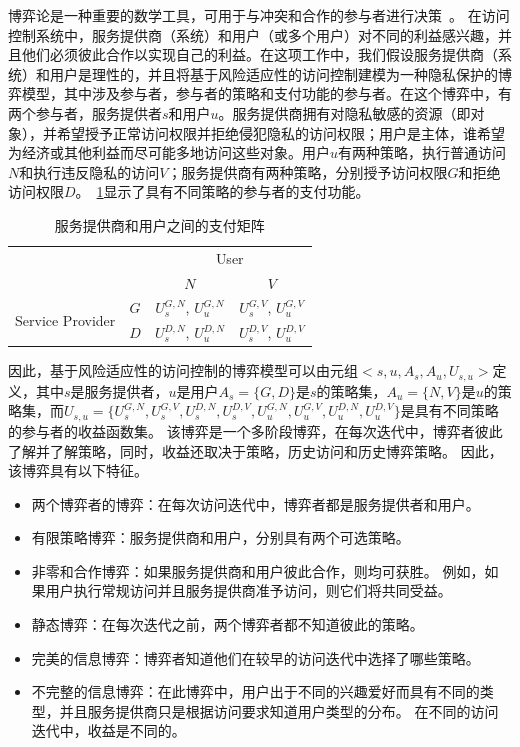 博弈论是一种重要的数学工具，可用于与冲突和合作的参与者进行决策~\cite{owen2001}。
在访问控制系统中，服务提供商（系统）和用户（或多个用户）对不同的利益感兴趣，并且他们必须彼此合作以实现自己的利益。在这项工作中，我们假设服务提供商（系统）和用户是理性的，并且将基于风险适应性的访问控制建模为一种隐私保护的博弈模型，其中涉及参与者，参与者的策略和支付功能的参与者。在这个博弈中，有两个参与者，服务提供者$s$和用户$u$。服务提供商拥有对隐私敏感的资源（即对象），并希望授予正常访问权限并拒绝侵犯隐私的访问权限；用户是主体，谁希望为经济或其他利益而尽可能多地访问这些对象。用户$u$有两种策略，执行普通访问$N$和执行违反隐私的访问$V$；服务提供商有两种策略，分别授予访问权限$G$和拒绝访问权限$D$。~\ref{tab:payoff}显示了具有不同策略的参与者的支付功能。
\begin{table}[htb]
	\caption{服务提供商和用户之间的支付矩阵}\label{tab:payoff}
	\centering 
	\begin{tabular}{cccc}
		\toprule
		\multicolumn{2}{c}{\multirow{2}{*}{}} & \multicolumn{2}{c}{User} \\
		\cline{3-4}
		& & $N$ & $V$ \\	
		\hline
		\multirow{2}{*}{Service Provider} & $G$ &$U_s^{G,N}$, $U_u^{G,N}$ & $U_s^{G,V}$, $U_u^{G,V}$\\
		\cline{2-4}
		& $D$ & $U_s^{D,N}$, $U_u^{D,N}$ & $U_s^{D,V}$, $U_u^{D,V}$\\
		\toprule
	\end{tabular}
\end{table}


因此，基于风险适应性的访问控制的博弈模型可以由元组$<s,u,A_s,A_u,U_{s,u}>$定义，其中$s$是服务提供者，$u$是用户$A_s=\{G,D\}$是$s$的策略集，$A_u=\{N,V\}$是$u$的策略集，而$U_{s,u}=\{U_s^{G,N}, U_s^{G,V}, U_s^{D,N}, U_s^{D,V}, U_u^{G,N}, U_u^{G,V}, U_u^{D,N}, U_u^{D,V}\}$是具有不同策略的参与者的收益函数集。 该博弈是一个多阶段博弈，在每次迭代中，博弈者彼此了解并了解策略，同时，收益还取决于策略，历史访问和历史博弈策略。 因此，该博弈具有以下特征。
\begin{itemize}
	\item 两个博弈者的博弈：在每次访问迭代中，博弈者都是服务提供者和用户。
	\item 有限策略博弈：服务提供商和用户，分别具有两个可选策略。
	\item 非零和合作博弈：如果服务提供商和用户彼此合作，则均可获胜。 例如，如果用户执行常规访问并且服务提供商准予访问，则它们将共同受益。
	\item 静态博弈：在每次迭代之前，两个博弈者都不知道彼此的策略。
	\item 完美的信息博弈：博弈者知道他们在较早的访问迭代中选择了哪些策略。
	\item 不完整的信息博弈：在此博弈中，用户出于不同的兴趣爱好而具有不同的类型，并且服务提供商只是根据访问要求知道用户类型的分布。 在不同的访问迭代中，收益是不同的。
\end{itemize}

